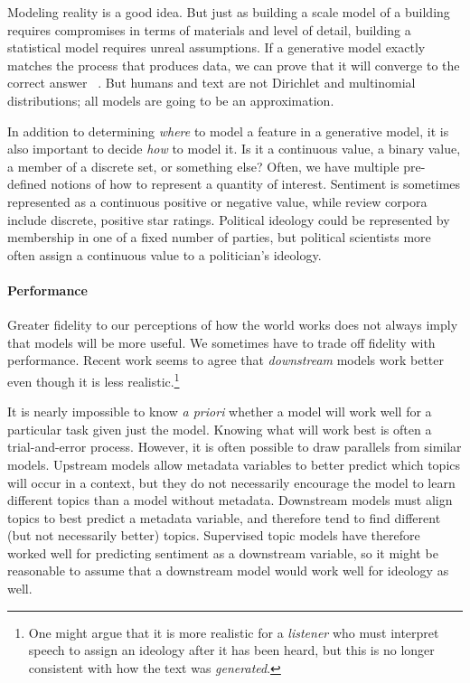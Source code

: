Modeling reality is a good idea. But just as building a scale model of a building requires compromises in terms of materials and level of detail, building a statistical model requires unreal assumptions.
If a generative model exactly
matches the process that produces data, we can prove that it will
converge to the correct answer ~\cite{}.
But humans and text are
not Dirichlet and multinomial distributions; all models are going to
be an approximation.

In addition to determining \emph{where} to model a feature in a
generative model, it is also important to decide \emph{how} to model
it.  Is it a continuous value, a binary value, a member of a discrete
set, or something else?  Often, we have multiple pre-defined notions of how to
represent a quantity of interest.
Sentiment is sometimes represented as a continuous positive or negative value, while review corpora include discrete, positive star ratings.
Political ideology could be represented by membership in one of a fixed number of
parties, but political scientists more often assign a continuous value to a
politician's ideology.

\paragraph{Performance}

Greater fidelity to our perceptions of how the world works does not always imply that models will be more  useful.
We sometimes have to trade off fidelity with performance.
Recent work seems to agree that \emph{downstream} models work better even though it is
less realistic.\footnote{One might argue that it is more realistic for
  a \emph{listener} who must interpret speech to assign an ideology
  after it has been heard, but this is no longer consistent with how
  the text was \emph{generated}.}  %

It is nearly impossible to know \textit{a priori} whether a
model will work well for a particular task given just the model.
Knowing what will work best is often a trial-and-error
process.
However, it is often possible to draw parallels from similar models.
Upstream models allow metadata variables to better predict which topics
will occur in a context, but they do not necessarily encourage the model to 
learn different topics than a model without metadata.
Downstream models must align topics to best predict a metadata variable, 
and therefore tend to find different (but not necessarily better) topics.
Supervised topic models have therefore worked well for predicting sentiment as a downstream variable, so it might be reasonable to assume
that a downstream model would work well for ideology as well.

